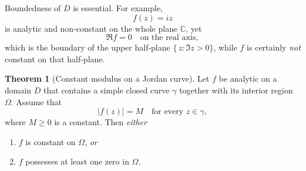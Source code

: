 \documentclass[12pt]{article}
\theoremstyle{definition} %
\newtheorem{theorem}{Theorem}
\theoremstyle{plain} %
\begin{document}
Boundedness of $D$ is essential.  
For example,
\[
f(z)=iz
\]
is analytic and non‑constant on the whole plane $\mathbb{C}$, yet
\[
\Re f = 0 \quad\text{on the real axis},
\]
which is the boundary of the upper half‑plane $\{\,z: \Im z>0\}$, while $f$ is certainly \emph{not} constant on that half‑plane.
\begin{theorem}[Constant modulus on a Jordan curve]
  \label{thm:constant‐mod‐or‐zero}
  Let $f$ be analytic on a domain $D$ that contains a simple closed curve
  $\gamma$ together with its interior region $\Omega$.
  Assume that
  \[
    |f(z)| = M \quad\text{for every } z\in\gamma ,
  \]
  where $M\ge 0$ is a constant.
  Then \emph{either}
  \begin{enumerate}
    \item $f$ is constant on $\Omega$, \emph{or}
    \item $f$ possesses at least one zero in $\Omega$.
  \end{enumerate}
  \end{theorem}
  
\end{document}
